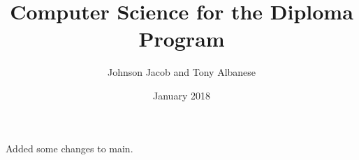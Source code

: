 \documentclass[a4paper,12pt]{book}
\begin{document}
\author{Johnson Jacob and Tony Albanese}
\title{Computer Science for the Diploma Program}
\date{January 2018}

\maketitle


Added some changes to main.


\end{document}
